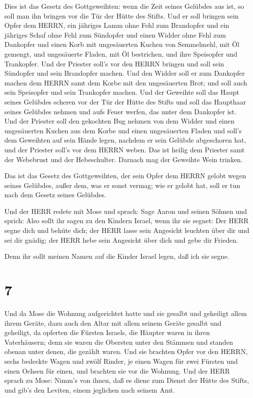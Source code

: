  Dies ist das Gesetz des Gottgeweihten: wenn die Zeit
seines Gelübdes aus ist, so soll man ihn bringen vor die Tür der Hütte
des Stifts.  Und er soll bringen sein Opfer dem HERRN, ein
jähriges Lamm ohne Fehl zum Brandopfer und ein jähriges Schaf ohne Fehl
zum Sündopfer und einen Widder ohne Fehl zum Dankopfer  und
einen Korb mit ungesäuerten Kuchen von Semmelmehl, mit Öl gemengt, und
ungesäuerte Fladen, mit Öl bestrichen, und ihre Speisopfer und
Trankopfer.  Und der Priester soll's vor den HERRN bringen
und soll sein Sündopfer und sein Brandopfer machen.  Und
den Widder soll er zum Dankopfer machen dem HERRN samt dem Korbe mit den
ungesäuerten Brot; und soll auch sein Speisopfer und sein Trankopfer
machen.  Und der Geweihte soll das Haupt seines Gelübdes
scheren vor der Tür der Hütte des Stifts und soll das Haupthaar seines
Gelübdes nehmen und aufs Feuer werfen, das unter dem Dankopfer ist.
 Und der Priester soll den gekochten Bug nehmen von dem
Widder und einen ungesäuerten Kuchen aus dem Korbe und einen
ungesäuerten Fladen und soll's dem Geweihten auf sein Hände legen,
nachdem er sein Gelübde abgeschoren hat,  und der Priester
soll's vor dem HERRN weben. Das ist heilig dem Priester samt der
Webebrust und der Hebeschulter. Darnach mag der Geweihte Wein trinken.

 Das ist das Gesetz des Gottgeweihten, der sein Opfer dem
HERRN gelobt wegen seines Gelübdes, außer dem, was er sonst vermag; wie
er gelobt hat, soll er tun nach dem Gesetz seines Gelübdes.

 Und der HERR redete mit Mose und sprach: 
Sage Aaron und seinen Söhnen und sprich: Also sollt ihr sagen zu den
Kindern Israel, wenn ihr sie segnet:  Der HERR segne dich
und behüte dich;  der HERR lasse sein Angesicht leuchten
über dir und sei dir gnädig;  der HERR hebe sein Angesicht
über dich und gebe dir Frieden.

 Denn ihr sollt meinen Namen auf die Kinder Israel legen,
daß ich sie segne.

\hypertarget{section-6}{%
\section{7}\label{section-6}}

 Und da Mose die Wohnung aufgerichtet hatte und sie gesalbt
und geheiligt allem ihrem Geräte, dazu auch den Altar mit allem seinem
Geräte gesalbt und geheiligt,  da opferten die Fürsten
Israels, die Häupter waren in ihren Vaterhäusern; denn sie waren die
Obersten unter den Stämmen und standen obenan unter denen, die gezählt
waren.  Und sie brachten Opfer vor den HERRN, sechs bedeckte
Wagen und zwölf Rinder, je einen Wagen für zwei Fürsten und einen Ochsen
für einen, und brachten sie vor die Wohnung.  Und der HERR
sprach zu Mose:  Nimm's von ihnen, daß es diene zum Dienst
der Hütte des Stifts, und gib's den Leviten, einem jeglichen nach seinem
Amt.

